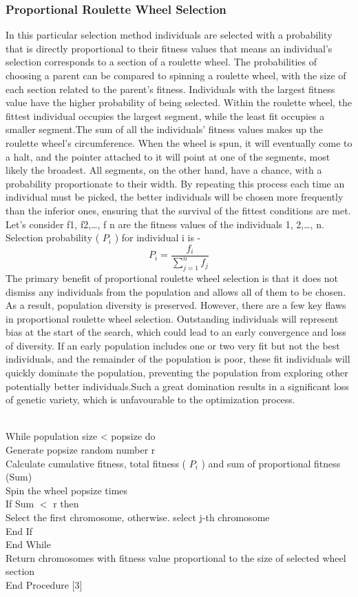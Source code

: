 \documentclass{article}
\begin{document}
\subsubsection{Proportional Roulette Wheel Selection}
In this particular selection method individuals are selected with a probability that is directly proportional to their
fitness values that means an individual's selection corresponds to a section of a roulette wheel. The probabilities of
choosing a parent can be compared to spinning a roulette wheel, with the size of each section related to the parent's
fitness. Individuals with the largest fitness value have the higher probability of being selected. Within the roulette
wheel, the fittest individual occupies the largest segment, while the least fit occupies a smaller segment.The sum of
all the individuals' fitness values makes up the roulette wheel's circumference. When the wheel is spun, it will
eventually come to a halt, and the pointer attached to it will point at one of the segments, most likely the broadest.
All segments, on the other hand, have a chance, with a probability proportionate to their width. By repeating this
process each time an individual must be picked, the better individuals will be chosen more frequently than the
inferior ones, ensuring that the survival of the fittest conditions are met. Let’s consider f1, f2,…, f n are the fitness
values of the individuals 1, 2,…, n. Selection probability ( $P_i$ ) for individual i is -    
\[ 
P_{i} = \frac{f_i}{\sum^{n}_{j=1} f_j}
\]
The primary benefit of proportional roulette wheel selection is that it does not dismiss any individuals from the
population and allows all of them to be chosen. As a result, population diversity is preserved. However, there are a
few key flaws in proportional roulette wheel selection. Outstanding individuals will represent bias at the start of the
search, which could lead to an early convergence and loss of diversity. If an early population includes one or two
very fit but not the best individuals, and the remainder of the population is poor, these fit individuals will quickly
dominate the population, preventing the population from exploring other potentially better individuals.Such a great
domination results in a significant loss of genetic variety, which is unfavourable to the optimization process.


\\While population size < popsize do\\
Generate popsize random number r\\
Calculate cumulative fitness, total fitness ( $P_i$ ) and sum of proportional fitness (Sum)\\
Spin the wheel popsize times\\
If Sum $<$ r then\\
Select the first chromosome, otherwise. select j-th chromosome\\
End If\\
End While\\
Return chromosomes with fitness value proportional to the size of selected wheel section\\
End Procedure [3]
\end{document}

